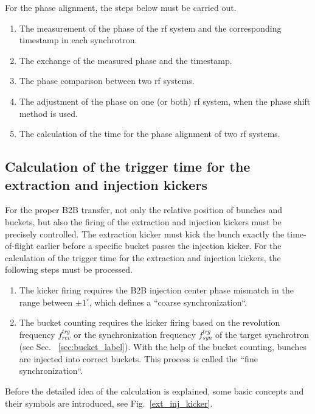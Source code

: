 For the phase alignment, the steps below must be carried out. 
\begin{enumerate}
\item The measurement of the phase of the rf system and the corresponding timestamp in each synchrotron.
\item The exchange of the measured phase and the timestamp.
\item The phase comparison between two rf systems.
\item The adjustment of the phase on one (or both) rf system, when the phase shift method is used. 
\item The calculation of the time for the phase alignment of two rf systems.
\end{enumerate}
\subsection{Calculation of the trigger time for the extraction and injection kickers}
\label{sec:compensation}
For the proper B2B transfer, not only the relative position of bunches and buckets, but also the firing of the extraction and injection kickers must be precisely controlled. The extraction kicker must kick the bunch exactly the time-of-flight earlier before a specific bucket passes the injection kicker. For the calculation of the trigger time for the extraction and injection kickers, the following steps must be processed. 
\begin{enumerate}
\item The kicker firing requires the B2B injection center phase mismatch in the range between $\pm 1^\circ$, which defines a ``coarse synchronization``.
\item The bucket counting requires the kicker firing based on the revolution frequency $f_{\mathit{rev}}^{\mathit{trg}}$ or the synchronization frequency $f_{\mathit{syn}}^{\mathit{trg}}$ of the target synchrotron (see Sec. ~\ref{sec:bucket_label}). With the help of the bucket counting, bunches are injected into correct buckets. This process is called the ``fine synchronization``.
\end{enumerate}

Before the detailed idea of the calculation is explained, some basic concepts and their symbols are introduced, see Fig.~\ref{ext_inj_kicker}.

